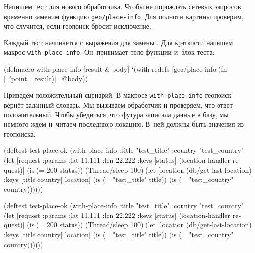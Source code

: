 
Напишем тест для нового обработчика. Чтобы не порождать сетевых запросов,
временно заменим функцию \verb|geo/place-info|. Для полноты картины проверим,
что случится, если геопоиск бросит исключение.

Каждый тест начинается с выражения  для замены
. Для краткости напишем макрос
\texttt{with\--place\--info}. Он~принимает тело функции и~блок теста:

\begin{english}
  \begin{clojure}
(defmacro with-place-info
  [result & body]
  `(with-redefs [geo/place-info
                 (fn [~'point] ~result)]
     ~@body))
  \end{clojure}
\end{english}

Приведём положительный сценарий. В макросе \texttt{with\--place\--info} геопоиск
вернёт заданный словарь. Мы вызываем обработчик и проверяем, что ответ
положительный. Чтобы убедиться, что футура записала данные в базу, мы немного
ждём и~читаем последнюю локацию. В~ней должны быть значения из геопоиска.

\ifnarrow

\begin{english}
  \begin{clojure}
(deftest test-place-ok
  (with-place-info
    {:title "test_title"
     :country "test_country"}
    (let [request {:params
                   {:lat 11.111
                    :lon 22.222}}
          {:keys [status]}
          (location-handler request)]
      (is (= 200 status))
      (Thread/sleep 100)
      (let [location
            (db/get-last-location)
            {:keys [title country]}
            location]
        (is (= "test_title" title))
        (is (= "test_country"
               country))))))
  \end{clojure}
\end{english}

\else

\begin{english}
  \begin{clojure}
(deftest test-place-ok
  (with-place-info
    {:title "test_title"
     :country "test_country"}
    (let [request {:params {:lat 11.111 :lon 22.222}}
          {:keys [status]} (location-handler request)]
      (is (= 200 status))
      (Thread/sleep 100)
      (let [location (db/get-last-location)
            {:keys [title country]} location]
        (is (= "test_title" title))
        (is (= "test_country" country))))))
  \end{clojure}
\end{english}

